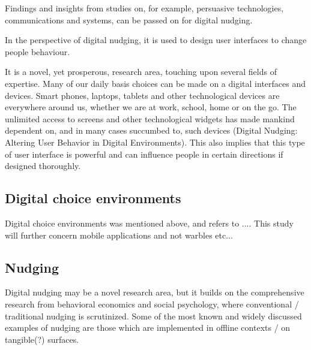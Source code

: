 Findings and insights from studies on, for example, persuasive technologies, communications and systems, can be passed on for digital nudging.

In the perspective of digital nudging, it is used to design user interfaces to change people behaviour. 

It is a novel, yet prosperous, research area, touching upon several fields of expertise. Many of our daily basis choices can be made on a digital interfaces and devices. Smart phones, laptops, tablets and other technological devices are everywhere around us, whether we are at work, school, home or on the go. The unlimited access to screens and other technological widgets has made mankind dependent on, and in many cases succumbed to, such devices (Digital Nudging: Altering User Behavior in Digital Environments). This also implies that this type of user interface is powerful and can influence people in certain directions if designed thoroughly. %

\subsection{Digital choice environments}
Digital choice environments was mentioned above, and refers to .... 
This study will further concern mobile applications and not warbles etc... 

\subsection{Nudging}

Digital nudging may be a novel research area, but it builds on the comprehensive research from behavioral economics and social psychology, where conventional / traditional nudging is scrutinized. Some of the most known and widely discussed examples of nudging are those which are implemented in offline contexts / on tangible(?) surfaces. 


